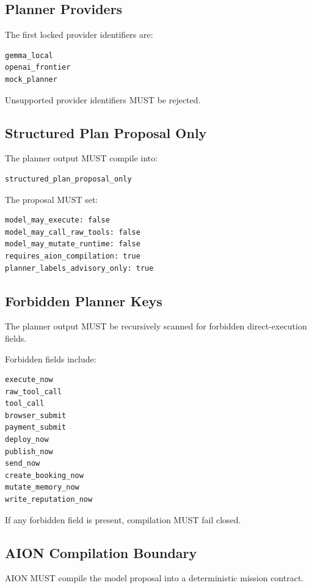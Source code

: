 \subsection{Planner Providers}

The first locked provider identifiers are:

\begin{verbatim}
gemma_local
openai_frontier
mock_planner
\end{verbatim}

Unsupported provider identifiers MUST be rejected.

\subsection{Structured Plan Proposal Only}

The planner output MUST compile into:

\begin{verbatim}
structured_plan_proposal_only
\end{verbatim}

The proposal MUST set:

\begin{verbatim}
model_may_execute: false
model_may_call_raw_tools: false
model_may_mutate_runtime: false
requires_aion_compilation: true
planner_labels_advisory_only: true
\end{verbatim}

\subsection{Forbidden Planner Keys}

The planner output MUST be recursively scanned for forbidden direct-execution fields.

Forbidden fields include:

\begin{verbatim}
execute_now
raw_tool_call
tool_call
browser_submit
payment_submit
deploy_now
publish_now
send_now
create_booking_now
mutate_memory_now
write_reputation_now
\end{verbatim}

If any forbidden field is present, compilation MUST fail closed.

\subsection{AION Compilation Boundary}

AION MUST compile the model proposal into a deterministic mission contract.

